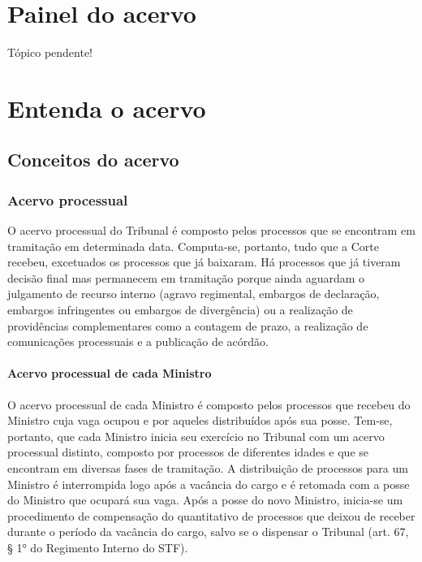 \documentclass[
]{book}
\begin{document}
\hypertarget{painel-do-acervo}{%
\section{Painel do acervo}\label{painel-do-acervo}}

Tópico pendente!

\hypertarget{entenda-o-acervo}{%
\section{Entenda o acervo}\label{entenda-o-acervo}}

\hypertarget{conceitos-do-acervo}{%
\subsection{Conceitos do acervo}\label{conceitos-do-acervo}}

\hypertarget{acervo-processual}{%
\subsubsection{Acervo processual}\label{acervo-processual}}

O acervo processual do Tribunal é composto pelos processos que se encontram em tramitação em determinada data. Computa-se, portanto, tudo que a Corte recebeu, excetuados os processos que já baixaram.
Há processos que já tiveram decisão final mas permanecem em tramitação porque ainda aguardam o julgamento de recurso interno (agravo regimental, embargos de declaração, embargos infringentes ou embargos de divergência) ou a realização de providências complementares como a contagem de prazo, a realização de comunicações processuais e a publicação de acórdão.

\hypertarget{acervo-processual-de-cada-ministro}{%
\paragraph{Acervo processual de cada Ministro}\label{acervo-processual-de-cada-ministro}}

O acervo processual de cada Ministro é composto pelos processos que recebeu do Ministro cuja vaga ocupou e por aqueles distribuídos após sua posse.
Tem-se, portanto, que cada Ministro inicia seu exercício no Tribunal com um acervo processual distinto, composto por processos de diferentes idades e que se encontram em diversas fases de tramitação. A distribuição de processos para um Ministro é interrompida logo após a vacância do cargo e é retomada com a posse do Ministro que ocupará sua vaga. Após a posse do novo Ministro, inicia-se um procedimento de compensação do quantitativo de processos que deixou de receber durante o período da vacância do cargo, salvo se o dispensar o Tribunal (art. 67, § 1° do Regimento Interno do STF).
\end{document}
